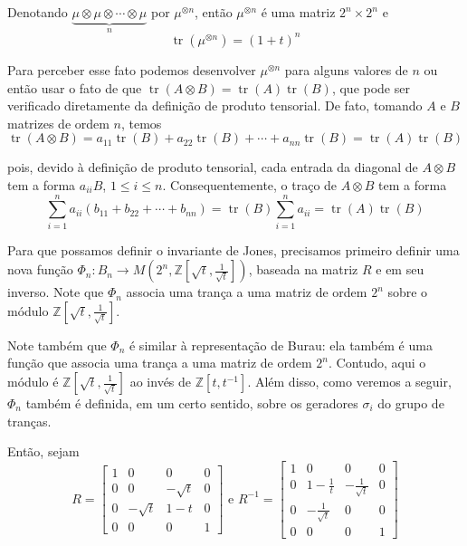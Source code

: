 \documentclass[a4paper,portuguese,11pt,twoside, leqno]{book}
\DeclareMathOperator{\tr}{tr}
\theoremstyle{definition}
\begin{document}
	\par\vspace{0.3cm} Denotando $\underbrace{\mu\otimes\mu\otimes\cdots\otimes\mu}_{n}$ por $\mu^{\otimes n}$, então $\mu^{\otimes n}$ é uma matriz $2^n\times 2^n$ e 
	\begin{equation}
	\label{mi tensor n vezes}
	\tr(\mu^{\otimes n}) = (1+t)^n
	\end{equation}
	\par\vspace{0.3cm} Para perceber esse fato podemos desenvolver $\mu^{\otimes n}$ para alguns valores de $n$ ou então usar o fato de que $\tr(A\otimes B) = \tr(A)\tr(B)$, que pode ser verificado diretamente da definição de produto tensorial. De fato, tomando $A$ e $B$ matrizes de ordem $n$, temos
	\begin{equation*}
	\tr(A\otimes B) = a_{11}\tr(B) + a_{22}\tr(B) + \cdots + a_{nn}\tr(B) = \tr(A)\tr(B)
	\end{equation*}
	\par\vspace{0.3cm} pois, devido à definição de produto tensorial, cada entrada da diagonal de $A\otimes B$ tem a forma $a_{ii}B$, $1\leq i\leq n$. Consequentemente, o traço de $A\otimes B$ tem a forma
	\begin{equation*}
	\sum_{i=1}^{n}a_{ii}(b_{11} + b_{22} + \cdots + b_{nn}) = \tr(B)\sum_{i=1}^{n}a_{ii} = \tr(A)\tr(B)
	\end{equation*}
	\par\vspace{0.3cm} Para que possamos definir o invariante de Jones, precisamos primeiro definir uma nova função $\Phi_n: B_n\to M(2^n, \mathbb{Z}[\sqrt{t}, \frac{1}{\sqrt{t}}])$, baseada na matriz $R$ e em seu inverso. Note que $\Phi_n$ associa uma trança a uma matriz de ordem $2^n$ sobre o módulo $\mathbb{Z}[\sqrt{t}, \frac{1}{\sqrt{t}}]$. 
	\par\vspace{0.3cm} Note também que $\Phi_n$ é similar à representação de Burau: ela também é uma função que associa uma trança a uma matriz de ordem $2^n$. Contudo, aqui o módulo é $\mathbb{Z}[\sqrt{t}, \frac{1}{\sqrt{t}}]$ ao invés de $\mathbb{Z}[t, t^{-1}]$. Além disso, como veremos a seguir, $\Phi_n$ também é definida, em um certo sentido, sobre os geradores $\sigma_i$ do grupo de tranças.
	\par\vspace{0.3cm} Então, sejam
	\begin{equation*}
	R = \begin{bmatrix}
	1 & 0 & 0 & 0 \\
	0 & 0 & -\sqrt{t} & 0 \\
	0 & -\sqrt{t} & 1-t & 0 \\
	0 & 0 & 0 & 1
	\end{bmatrix}\text{ e }R^{-1} = \begin{bmatrix}
	1 & 0 & 0 & 0 \\
	0 & 1 - \frac{1}{t} & -\frac{1}{\sqrt{t}} & 0 \\
	0 & -\frac{1}{\sqrt{t}} & 0 & 0 \\
	0 & 0 & 0 & 1
	\end{bmatrix}
	\end{equation*}
\end{document}
